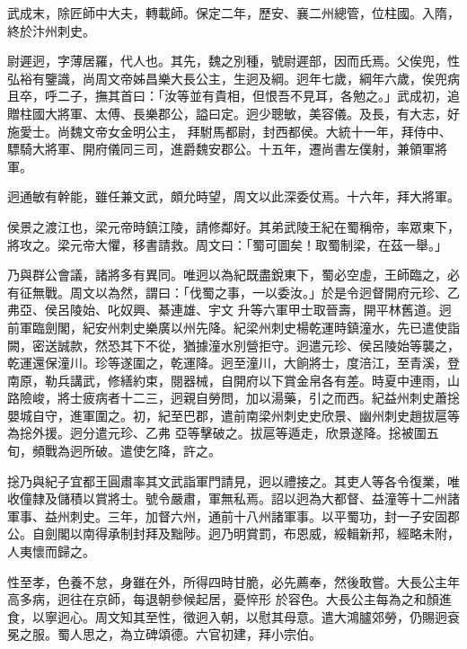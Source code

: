 \begin{pinyinscope}
 武成末，除匠師中大夫，轉載師。保定二年，歷安、襄二州總管，位柱國。入隋，終於汴州刺史。



 尉遲迥，字薄居羅，代人也。其先，魏之別種，號尉遲部，因而氏焉。父俟兜，性弘裕有鑒識，尚周文帝姊昌樂大長公主，生迥及綱。迥年七歲，綱年六歲，俟兜病且卒，呼二子，撫其首曰：「汝等並有貴相，但恨吾不見耳，各勉之。」武成初，追贈柱國大將軍、太傅、長樂郡公，謚曰定。迥少聰敏，美容儀。及長，有大志，好施愛士。尚魏文帝女金明公主，
 拜駙馬都尉，封西都侯。大統十一年，拜侍中、驃騎大將軍、開府儀同三司，進爵魏安郡公。十五年，遷尚書左僕射，兼領軍將軍。



 迥通敏有幹能，雖任兼文武，頗允時望，周文以此深委仗焉。十六年，拜大將軍。



 侯景之渡江也，梁元帝時鎮江陵，請修鄰好。其弟武陵王紀在蜀稱帝，率眾東下，將攻之。梁元帝大懼，移書請救。周文曰：「蜀可圖矣！取蜀制梁，在茲一舉。」



 乃與群公會議，諸將多有異同。唯迥以為紀既盡銳東下，蜀必空虛，王師臨之，必有征無戰。周文以為然，謂曰：「伐蜀之事，一以委汝。」於是令迥督開府元珍、乙弗亞、侯呂陵始、叱奴興、綦連雄、宇文
 升等六軍甲士取晉壽，開平林舊道。迥前軍臨劍閣，紀安州刺史樂廣以州先降。紀梁州刺史楊乾運時鎮潼水，先已遣使詣闕，密送誠款，然恐其下不從，猶據潼水別營拒守。迥遣元珍、侯呂陵始等襲之，乾運還保潼川。珍等遂圍之，乾運降。迥至潼川，大餉將士，度涪江，至青溪，登南原，勒兵講武，修繕約束，閱器械，自開府以下賞金帛各有差。時夏中連雨，山路險峻，將士疲病者十二三，迥親自勞問，加以湯藥，引之而西。紀益州刺史蕭捴嬰城自守，進軍圍之。初，紀至巴郡，遣前南梁州刺史史欣景、幽州刺史趙拔扈等為捴外援。迥分遣元珍、乙弗
 亞等擊破之。拔扈等遁走，欣景遂降。捴被圍五旬，頻戰為迥所破。遣使乞降，許之。



 捴乃與紀子宜都王圓肅率其文武詣軍門請見，迥以禮接之。其吏人等各令復業，唯收僮隸及儲積以賞將士。號令嚴肅，軍無私焉。詔以迥為大都督、益潼等十二州諸軍事、益州刺史。三年，加督六州，通前十八州諸軍事。以平蜀功，封一子安固郡公。自劍閣以南得承制封拜及黜陟。迥乃明賞罰，布恩威，綏輯新邦，經略未附，人夷懷而歸之。



 性至孝，色養不怠，身雖在外，所得四時甘脆，必先薦奉，然後敢嘗。大長公主年高多病，迥往在京師，每退朝參候起居，憂悴形
 於容色。大長公主每為之和顏進食，以寧迥心。周文知其至性，徵迥入朝，以慰其母意。遣大鴻臚郊勞，仍賜迥袞冕之服。蜀人思之，為立碑頌德。六官初建，拜小宗伯。




\end{pinyinscope}
